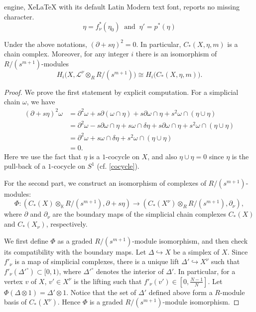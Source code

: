 \documentclass[10pt,a4paper]{amsart}
\newcommand{\K}{\mathbb{K}}
\newcommand{\sL}{\mathcal{L}}
\begin{document}
engine, XeLaTeX with its default Latin Modern text font, reports no missing character.
\begin{equation}\label{cocycle} \eta=f_\nu^*(\eta_0) \ \text{ and } \ \eta'=p^*(\eta) \end{equation} 

\begin{prop} \label{prop key}
Under the above notations, $(\partial+s\eta)^2=0$. In particular, $C_*(X, \eta, m)$ is a chain complex. Moreover, for any integer $i$ there is an isomorphism of $R/(s^{m+1})$-modules
\begin{equation}\label{eq1}
H_i\big(X, \sL^\nu\otimes_R R/(s^{m+1})\big)\cong H_i\big(C_*(X, \eta, m)\big).
\end{equation}
\end{prop}

\begin{proof}
We prove the first statement by explicit computation. For a simplicial chain $\omega$, we have
\begin{align*}
(\partial+s \eta)^2\omega&=\partial^2\omega+s\partial(\omega\cap \eta)+s \partial\omega\cap \eta+s^2\omega\cap(\eta\cup\eta)\\
&=\partial^2\omega-s\partial\omega\cap\eta+s\omega\cap\delta\eta+s\partial\omega\cap\eta+s^2\omega\cap(\eta\cup\eta)\\
&=\partial^2\omega+s\omega\cap\delta\eta+s^2\omega\cap(\eta\cup\eta)\\
&=0.
\end{align*}
Here we use the fact that $\eta$ is a $1$-cocycle on $X$, and also $\eta \cup \eta=0$ since $\eta$ is the pull-back of a $1$-cocycle on $S^1$ (cf. \eqref{cocycle}).

For the second part, we construct an isomorphism of complexes of $R/(s^{m+1})$-modules:
\begin{equation}\label{eq3}
\Phi: \left(C_*(X)\otimes_{\K}R/(s^{m+1}), \partial+s\eta \right)\to \left(C_*(X^\nu)\otimes_{R} R/(s^{m+1}), \partial_\nu\right),
\end{equation}
where $\partial$ and $\partial_\nu$ are the boundary maps of the simplicial chain complexes $C_*(X)$ and $C_*(X_\nu)$, respectively.

We first define $\Phi$ as a graded $R/(s^{m+1})$-module isomorphism, and then check its compatibility with the boundary maps. Let $\Delta\hookrightarrow X$ be a simplex of $X$. Since $f'_\nu$ is a map of simplicial complexes, there is a unique lift $\Delta'\hookrightarrow X^\nu$ such that $f'_\nu(\Delta'^\circ)\subset [0, 1)$, where $\Delta'^\circ$ denotes the interior of $\Delta'$. 
In particular, for a vertex $v$ of $X$, $v'\in X^\nu$ is the lifting such that $f'_\nu(v')\in [0, \frac{N-1}{N}]$.
Let $\Phi(\Delta\otimes 1)=\Delta'\otimes 1$. Notice that the set of $\Delta'$ defined above form a $R$-module basis of $C_*(X^\nu)$. Hence $\Phi$ is a graded $R/(s^{m+1})$-module isomorphism. 


\end{proof}
\end{document}

